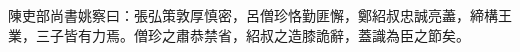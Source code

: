 \begin{pinyinscope}
 陳吏部尚書姚察曰：張弘策敦厚慎密，呂僧珍恪勤匪懈，鄭紹叔忠誠亮藎，締構王業，三子皆有力焉。僧珍之肅恭禁省，紹叔之造膝詭辭，蓋識為臣之節矣。



\end{pinyinscope}